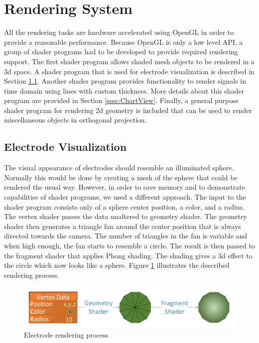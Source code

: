 \section{Rendering System}
\label{sec:implRendering}
All the rendering tasks are hardware accelerated using OpenGL in order to provide a reasonable performance. Because OpenGL is only a low level API, a group of shader programs had to be developed to provide required rendering support. The first shader program allows shaded mesh objects to be rendered in a \gls{3d} space. A shader program that is used for electrode visualization is described in Section \ref{ssec:implElVis}. Another shader program provides functionality to render signals in time domain using lines with custom thickness. More details about this shader program are provided in Section \ref{ssec:ChartView}. Finally, a general purpose shader program for rendering \gls{2d} geometry is included that can be used to render miscellaneous objects in orthogonal projection.  

\subsection{Electrode Visualization}
\label{ssec:implElVis}
The visual appearance of electrodes should resemble an illuminated sphere. Normally this would be done by creating a mesh of the sphere that could be rendered the usual way. However, in order to save memory and to demonstrate capabilities of shader programs, we used a different approach. The input to the shader program consists only of a sphere center position, a color, and a radius. The vertex shader passes the data unaltered to geometry shader. The geometry shader then generates a triangle fan around the center position that is always directed towards the camera. The number of triangles in the fan is variable and when high enough, the fan starts to resemble a circle. The result is then passed to the fragment shader that applies Phong shading. The shading gives a \gls{3d} effect to the circle which now looks like a sphere. Figure \ref{fig:ElRender} illustrates the described rendering process.

\begin{figure}[htb]
	\centering
	\includegraphics[width=1\linewidth]{fig/ElRender.pdf}
	\caption{Electrode rendering process}
	\label{fig:ElRender}
\end{figure}

